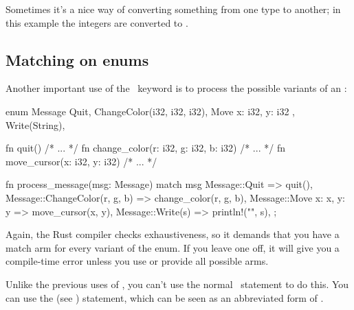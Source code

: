 Sometimes it's a nice way of converting something from one type to another; in this example the integers are converted to \String.

\subsection*{Matching on enums}

Another important use of the \match\ keyword is to process the possible variants of an \enum:

\begin{rustc}
enum Message {
    Quit,
    ChangeColor(i32, i32, i32),
    Move { x: i32, y: i32 },
    Write(String),
}

fn quit() { /* ... */ }
fn change_color(r: i32, g: i32, b: i32) { /* ... */ }
fn move_cursor(x: i32, y: i32) { /* ... */ }

fn process_message(msg: Message) {
    match msg {
        Message::Quit => quit(),
        Message::ChangeColor(r, g, b) => change_color(r, g, b),
        Message::Move { x: x, y: y } => move_cursor(x, y),
        Message::Write(s) => println!("{}", s),
    };
}
\end{rustc}

Again, the Rust compiler checks exhaustiveness, so it demands that you have a match arm for every variant of the enum. If you leave 
one off, it will give you a compile-time error unless you use \code{\_} or provide all possible arms.

\blank

Unlike the previous uses of \match, you can't use the normal \keyif\ statement to do this. You can use the  (see 
) statement, which can be seen as an abbreviated form of \match.
